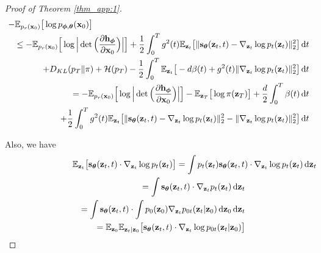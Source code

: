 \documentclass{article}
\theoremstyle{definition}
\theoremstyle{remark}
\newcommand*\diff{\mathop{}\!\mathrm{d}}
\begin{document}
\begin{proof}[Proof of Theorem \ref{thm_app:1}]
		\begin{eqnarray*}
			\lefteqn{-\mathbb{E}_{p_{r}(\mathbf{x}_{0})}\big[\log{p_{\bm{\phi},\bm{\theta}}(\mathbf{x}_{0})}\big]}\\
			&&\le -\mathbb{E}_{p_{r}(\mathbf{x}_{0})}\Big[\log{\Big\vert\det\Big(\frac{\partial\mathbf{h}_{\bm{\phi}}}{\partial\mathbf{x}_{0}}\Big)\Big\vert}\Big] + \frac{1}{2}\int_{0}^{T}g^{2}(t)\mathbb{E}_{\mathbf{z}_{t}}\big[\Vert\mathbf{s}_{\bm{\theta}}(\mathbf{z}_{t},t)-\nabla_{\mathbf{z}_{t}}\log{p_{t}(\mathbf{z}_{t})}\Vert_{2}^{2}\big]\diff t\\
			&&\quad +D_{KL}(p_{T}\Vert\pi) +\mathcal{H}(p_{T})-\frac{1}{2}\int_{0}^{T}\mathbb{E}_{\mathbf{z}_{t}}\big[-d\beta(t)+g^{2}(t)\Vert\nabla_{\mathbf{z}_{t}}\log{p_{t}(\mathbf{z}_{t})}\Vert_{2}^{2}\big]\diff t\\
			&&= -\mathbb{E}_{p_{r}(\mathbf{x}_{0})}\Big[\log{\Big\vert\det\Big(\frac{\partial\mathbf{h}_{\bm{\phi}}}{\partial\mathbf{x}_{0}}\Big)\Big\vert}\Big] -\mathbb{E}_{\mathbf{z}_{T}}\big[\log{\pi(\mathbf{z}_{T})}\big] +\frac{d}{2}\int_{0}^{T}\beta(t)\diff t\\
			&&\quad+\frac{1}{2}\int_{0}^{T}g^{2}(t)\mathbb{E}_{\mathbf{z}_{t}}\big[\Vert\mathbf{s}_{\bm{\theta}}(\mathbf{z}_{t},t)-\nabla_{\mathbf{z}_{t}}\log{p_{t}(\mathbf{z}_{t})}\Vert_{2}^{2}-\Vert\nabla_{\mathbf{z}_{t}}\log{p_{t}(\mathbf{z}_{t})}\Vert_{2}^{2} \big]\diff t
		\end{eqnarray*}
		
		Also, we have
		\begin{eqnarray*}
			\lefteqn{\mathbb{E}_{\mathbf{z}_{t}}\big[\mathbf{s}_{\bm{\theta}}(\mathbf{z}_{t},t)\cdot\nabla_{\mathbf{z}_{t}}\log{p_{t}(\mathbf{z}_{t})}\big]=\int p_{t}(\mathbf{z}_{t})\mathbf{s}_{\bm{\theta}}(\mathbf{z}_{t},t)\cdot\nabla_{\mathbf{z}_{t}}\log{p_{t}(\mathbf{z}_{t})}\diff\mathbf{z}_{t}}\\
			&&=\int \mathbf{s}_{\bm{\theta}}(\mathbf{z}_{t},t)\cdot\nabla_{\mathbf{z}_{t}}p_{t}(\mathbf{z}_{t})\diff\mathbf{z}_{t}\\
			&&=\int \mathbf{s}_{\bm{\theta}}(\mathbf{z}_{t},t)\cdot \int p_{0}(\mathbf{z}_{0})\nabla_{\mathbf{z}_{t}}p_{0t}(\mathbf{z}_{t}\vert\mathbf{z}_{0})\diff\mathbf{z}_{0}\diff\mathbf{z}_{t}\\
			&&=\mathbb{E}_{\mathbf{z}_{0}}\mathbb{E}_{\mathbf{z}_{t}\vert\mathbf{z}_{0}}\big[\mathbf{s}_{\bm{\theta}}(\mathbf{z}_{t},t)\cdot\nabla_{\mathbf{z}_{t}}\log{p_{0t}(\mathbf{z}_{t}\vert\mathbf{z}_{0})}\big]
		\end{eqnarray*}
		

\end{proof}
\end{document}

